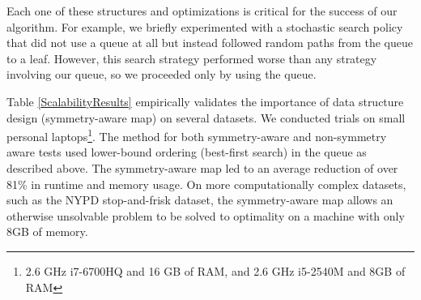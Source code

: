\documentclass[format=sigconf]{acmart}
\begin{document}

Each one of these structures and optimizations is critical for the success of our algorithm.
For example, we briefly experimented with a stochastic search policy that did not use a queue at all but instead followed random paths from the queue to a leaf.
However, this search strategy performed worse than any strategy involving our queue, so we proceeded only by using the queue.

Table \ref{ScalabilityResults} empirically validates the importance of data structure design (symmetry-aware map) on several datasets.
We conducted trials on small personal laptops\footnote{2.6 GHz i7-6700HQ and 16 GB of RAM, and 2.6 GHz i5-2540M and 8GB of RAM}.
The method for both symmetry-aware and non-symmetry aware tests used lower-bound ordering (best-first search) in the queue as described above.
The symmetry-aware map led to an average reduction of over 81\% in runtime and memory usage. 
On more computationally complex datasets, such as the NYPD stop-and-frisk dataset, the symmetry-aware map allows an otherwise unsolvable problem to be solved to optimality on a machine with only 8GB of memory.
\end{document}

